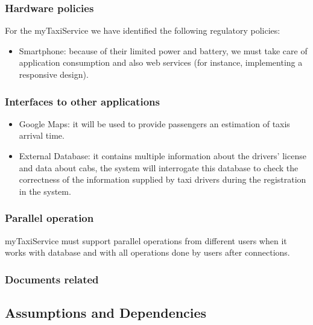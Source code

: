 \documentclass[a4paper,12pt]{article}%
\begin{document}
\subsubsection{Hardware policies}
For the myTaxiService we have identified the following regulatory policies:
\begin{itemize}
\item Smartphone: because of their limited power and battery, we must take care of application consumption and also web services (for instance, implementing a responsive design).
\end{itemize}
\subsubsection{Interfaces to other applications}
\begin{itemize}
\item Google Maps: it will be used to provide passengers an estimation of taxis arrival time.
\item External Database: it contains multiple information about the drivers' license and data about cabs, the system will interrogate this database to check the correctness of the information supplied by taxi drivers during the registration in the system.
\end{itemize} 
\subsubsection{Parallel operation}
myTaxiService must support parallel operations from different users when it works
with database and with all operations done by users after connections.
\subsubsection{Documents related}
\subsection{Assumptions and Dependencies}
\end{document}
